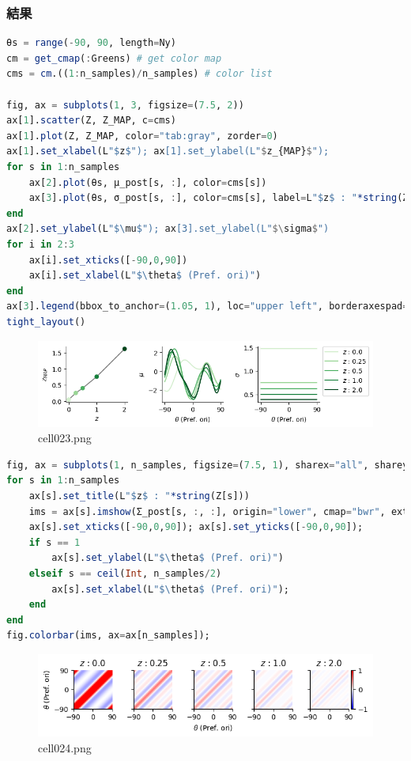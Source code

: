 \subsubsection{結果}
\begin{lstlisting}[language=julia]
θs = range(-90, 90, length=Ny)
cm = get_cmap(:Greens) # get color map
cms = cm.((1:n_samples)/n_samples) # color list

fig, ax = subplots(1, 3, figsize=(7.5, 2))
ax[1].scatter(Z, Z_MAP, c=cms)
ax[1].plot(Z, Z_MAP, color="tab:gray", zorder=0)
ax[1].set_xlabel(L"$z$"); ax[1].set_ylabel(L"$z_{MAP}$"); 
for s in 1:n_samples
    ax[2].plot(θs, μ_post[s, :], color=cms[s])
    ax[3].plot(θs, σ_post[s, :], color=cms[s], label=L"$z$ : "*string(Z[s]))
end
ax[2].set_ylabel(L"$\mu$"); ax[3].set_ylabel(L"$\sigma$")
for i in 2:3
    ax[i].set_xticks([-90,0,90])
    ax[i].set_xlabel(L"$\theta$ (Pref. ori)")
end
ax[3].legend(bbox_to_anchor=(1.05, 1), loc="upper left", borderaxespad=0)
tight_layout()
\end{lstlisting}
\begin{figure}[ht]
	\centering
	\includegraphics[scale=0.8, max width=\linewidth]{./fig/bayesian-brain/neural-sampling/cell023.png}
	\caption{cell023.png}
	\label{cell023.png}
\end{figure}
\begin{lstlisting}[language=julia]
fig, ax = subplots(1, n_samples, figsize=(7.5, 1), sharex="all", sharey="all")
for s in 1:n_samples
    ax[s].set_title(L"$z$ : "*string(Z[s]))
    ims = ax[s].imshow(Σ_post[s, :, :], origin="lower", cmap="bwr", extent=(-90, 90, -90, 90), vmin=-1, vmax=1)
    ax[s].set_xticks([-90,0,90]); ax[s].set_yticks([-90,0,90]);
    if s == 1
        ax[s].set_ylabel(L"$\theta$ (Pref. ori)")
    elseif s == ceil(Int, n_samples/2) 
        ax[s].set_xlabel(L"$\theta$ (Pref. ori)"); 
    end
end
fig.colorbar(ims, ax=ax[n_samples]);
\end{lstlisting}
\begin{figure}[ht]
	\centering
	\includegraphics[scale=0.8, max width=\linewidth]{./fig/bayesian-brain/neural-sampling/cell024.png}
	\caption{cell024.png}
	\label{cell024.png}
\end{figure}
